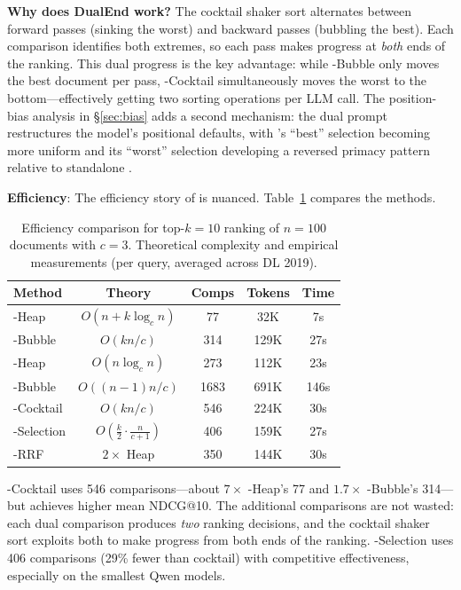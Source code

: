 \textbf{Why does DualEnd work?} The cocktail shaker sort alternates between forward passes (sinking the worst) and backward passes (bubbling the best). Each comparison identifies both extremes, so each pass makes progress at \emph{both} ends of the ranking. This dual progress is the key advantage: while \topdown{}-Bubble only moves the best document per pass, \dualend{}-Cocktail simultaneously moves the worst to the bottom---effectively getting two sorting operations per LLM call. The position-bias analysis in \S\ref{sec:bias} adds a second mechanism: the dual prompt restructures the model's positional defaults, with \dualend{}'s ``best'' selection becoming more uniform and its ``worst'' selection developing a reversed primacy pattern relative to standalone \bottomup{}.

\textbf{Efficiency}: The efficiency story of \dualend{} is nuanced. Table~\ref{tab:efficiency} compares the methods.

\begin{table}[!htbp]
\caption{Efficiency comparison for top-$k{=}10$ ranking of $n{=}100$ documents with $c{=}3$. Theoretical complexity and empirical measurements (per query, averaged across DL 2019).}
\label{tab:efficiency}
\small
\begin{tabular}{lcccc}
\toprule
\textbf{Method} & \textbf{Theory} & \textbf{Comps} & \textbf{Tokens} & \textbf{Time} \\
\midrule
\topdown{}-Heap & $O(n{+}k\log_c n)$ & 77 & 32K & 7s \\
\topdown{}-Bubble & $O(kn/c)$ & 314 & 129K & 27s \\
\bottomup{}-Heap & $O(n \log_c n)$ & 273 & 112K & 23s \\
\bottomup{}-Bubble & $O((n{-}1)n/c)$ & 1683 & 691K & 146s \\
\dualend{}-Cocktail & $O(kn/c)$ & 546 & 224K & 30s \\
\dualend{}-Selection & $O(\frac{k}{2} \cdot \frac{n}{c{+}1})$ & 406 & 159K & 27s \\
\bidir{}-RRF & $2 \times$ Heap & 350 & 144K & 30s \\
\bottomrule
\end{tabular}
\end{table}

\dualend{}-Cocktail uses 546 comparisons---about $7\times$ \topdown{}-Heap's 77 and $1.7\times$ \topdown{}-Bubble's 314---but achieves higher mean NDCG@10. The additional comparisons are not wasted: each dual comparison produces \emph{two} ranking decisions, and the cocktail shaker sort exploits both to make progress from both ends of the ranking. \dualend{}-Selection uses 406 comparisons (29\% fewer than cocktail) with competitive effectiveness, especially on the smallest Qwen models.

